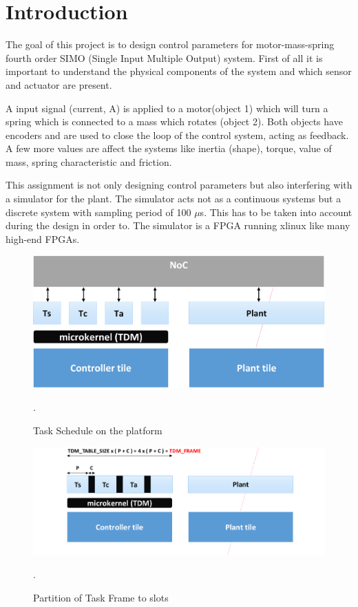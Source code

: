 \section{Introduction}
The goal of this project is to design control parameters for motor-mass-spring fourth order SIMO (Single Input Multiple Output) system. First of all it is important to understand the physical components of the system and which sensor and actuator are present.

A input signal (current, A) is applied to a motor(object 1) which will turn a spring which is connected to a mass which rotates (object 2). Both objects have encoders and are used to close the loop of the control system, acting as feedback. A few more values are affect the systems like inertia (shape), torque, value of mass, spring characteristic and friction.

This assignment is not only designing control parameters but also interfering with a simulator for the plant. The simulator acts not as a continuous systems but a discrete system with sampling period of 100 $\mu$s. This has to be taken into account during the design in order to. The simulator is a FPGA running xlinux like many high-end FPGAs. 

\begin{figure}[h]
	\begin{center}
		\includegraphics[width=0.7\linewidth]{img/plant}
		\caption{Task Schedule on the platform}.
		\label{fig:plant}
	\end{center}
\end{figure}

\begin{figure}[h]
	\begin{center}
		\includegraphics[width=0.7\linewidth]{img/task}
		\caption{Partition of Task Frame to slots}.
		\label{fig:task}
	\end{center}
\end{figure}




